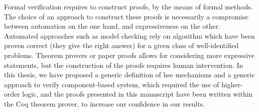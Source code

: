 Formal verification requires to construct proofs, by the means of formal
methods.
%
The choice of an approach to construct these proofs is necessarily a compromise
between automation on the one hand, and expressiveness on the other.
%
Automated approaches such as model checking rely on algorithm which have been
proven correct (they give the right answer) for a given class of well-identified
problems.
%
Theorem provers or paper proofs allows for considering more expressive
statements, but the construction of the proofs requires human intervention.
%
In this thesis, we have proposed a generic definition of \ac{hse} mechanisms and
a generic approach to verify component-based system, which required the use of
higher-order logic, and the proofs presented in this manuscript have been
written within the Coq theorem prover, to increase our confidence in our
results.

